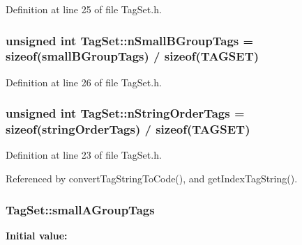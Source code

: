 Definition at line 25 of file TagSet.h.\hypertarget{classkmaOrange_1_1TagSet_c90423f53e2c05b9a477bb4c2e8e4f2d}{
\subsubsection[{nSmallBGroupTags}]{\setlength{\rightskip}{0pt plus 5cm}unsigned int {\bf TagSet::nSmallBGroupTags} = sizeof({\bf smallBGroupTags}) / sizeof({\bf TAGSET})}}
\label{classkmaOrange_1_1TagSet_c90423f53e2c05b9a477bb4c2e8e4f2d}




Definition at line 26 of file TagSet.h.\hypertarget{classkmaOrange_1_1TagSet_e5c42e1b00247c5fc5e2c17b55079fbc}{
\subsubsection[{nStringOrderTags}]{\setlength{\rightskip}{0pt plus 5cm}unsigned int {\bf TagSet::nStringOrderTags} = sizeof({\bf stringOrderTags}) / sizeof({\bf TAGSET})}}
\label{classkmaOrange_1_1TagSet_e5c42e1b00247c5fc5e2c17b55079fbc}




Definition at line 23 of file TagSet.h.

Referenced by convertTagStringToCode(), and getIndexTagString().\hypertarget{classkmaOrange_1_1TagSet_c74342cb8a38252ea97d0a98d2a8ff45}{
\subsubsection[{smallAGroupTags}]{ {\bf TagSet::smallAGroupTags}}}
\label{classkmaOrange_1_1TagSet_c74342cb8a38252ea97d0a98d2a8ff45}


\textbf{Initial value:}

